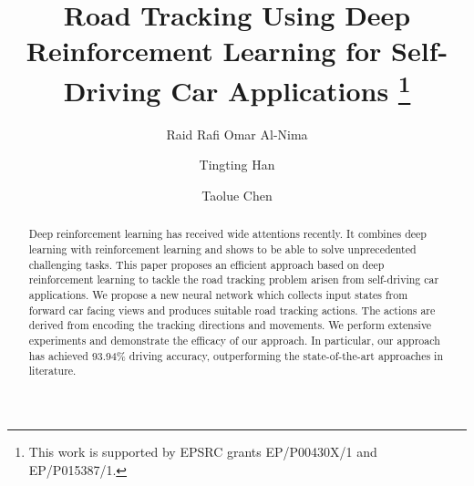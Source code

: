 \documentclass{svproc}
\begin{document}
	\mainmatter              %
\title{Road Tracking Using Deep Reinforcement Learning for Self-Driving Car Applications
\thanks{This work is supported by EPSRC grants EP/P00430X/1 and EP/P015387/1.}}
\author{Raid Rafi Omar Al-Nima \and Tingting Han \and Taolue Chen}
\maketitle               

\begin{abstract}
	Deep reinforcement learning has received wide attentions recently. It combines deep learning with reinforcement learning and shows to be able to solve unprecedented challenging tasks. This paper proposes an efficient approach based on deep reinforcement learning to tackle the road tracking problem arisen from self-driving car applications. We propose a new neural network which collects input states from forward car facing views and produces suitable road tracking actions. The actions are derived from encoding the tracking directions and movements. 
	We perform extensive experiments and demonstrate the efficacy of our approach. In particular, our approach has achieved 93.94\% driving  accuracy, outperforming the state-of-the-art approaches in literature. 

\end{abstract}
\end{document}
